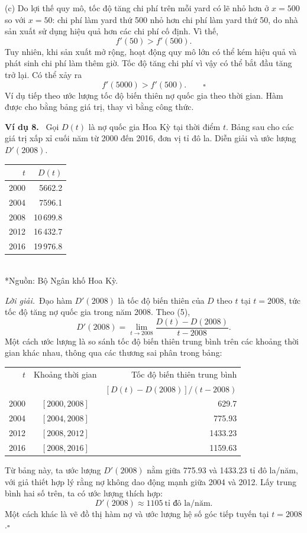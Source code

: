 \documentclass[12pt,a4paper]{article}
\newcommand{\ex}[1]{\par\medskip\noindent\textbf{Ví dụ #1.}\ }
\newcommand{\sol}{\par\nopagebreak[4]\noindent\textit{Lời giải.}\ }
\begin{document}
(c) Do lợi thế quy mô, tốc độ tăng chi phí trên mỗi yard có lẽ nhỏ hơn ở $x=500$ so với $x=50$: chi phí làm yard thứ 500 nhỏ hơn chi phí làm yard thứ 50, do nhà sản xuất sử dụng hiệu quả hơn các chi phí cố định. Vì thế,
\[f'(50)>f'(500).\]
Tuy nhiên, khi sản xuất mở rộng, hoạt động quy mô lớn có thể kém hiệu quả và phát sinh chi phí làm thêm giờ. Tốc độ tăng chi phí vì vậy có thể bắt đầu tăng trở lại. Có thể xảy ra
\[f'(5000)>f'(500).\qquad\square\]
Ví dụ tiếp theo ước lượng tốc độ biến thiên nợ quốc gia theo thời gian. Hàm được cho bằng bảng giá trị, thay vì bằng công thức.
\ex{8} Gọi $D(t)$ là nợ quốc gia Hoa Kỳ tại thời điểm $t$. Bảng sau cho các giá trị xấp xỉ cuối năm từ 2000 đến 2016, đơn vị tỉ đô la. Diễn giải và ước lượng $D'(2008)$.
\begin{center}\begin{tabular}{rr}\toprule$t$&$D(t)$\\\midrule
2000&5662.2\\2004&7596.1\\2008&10\,699.8\\2012&16\,432.7\\2016&19\,976.8\\\bottomrule
\end{tabular}\\*{\small Nguồn: Bộ Ngân khố Hoa Kỳ.}\end{center}
\sol Đạo hàm $D'(2008)$ là tốc độ biến thiên của $D$ theo $t$ tại $t=2008$, tức tốc độ tăng nợ quốc gia trong năm 2008. Theo (5),
\[D'(2008)=\lim_{t\to2008}\frac{D(t)-D(2008)}{t-2008}.\]
Một cách ước lượng là so sánh tốc độ biến thiên trung bình trên các khoảng thời gian khác nhau, thông qua các thương sai phân trong bảng:
\begin{center}\begin{tabular}{rcr}\toprule
$t$&Khoảng thời gian&Tốc độ biến thiên trung bình\\
&&$[D(t)-D(2008)]/(t-2008)$\\\midrule
2000&$[2000,2008]$&629.7\\
2004&$[2004,2008]$&775.93\\
2012&$[2008,2012]$&1433.23\\
2016&$[2008,2016]$&1159.63\\\bottomrule
\end{tabular}\end{center}
Từ bảng này, ta ước lượng $D'(2008)$ nằm giữa 775.93 và 1433.23 tỉ đô la/năm, với giả thiết hợp lý rằng nợ không dao động mạnh giữa 2004 và 2012. Lấy trung bình hai số trên, ta có ước lượng thích hợp:
\[D'(2008)\approx1105\ \text{tỉ đô la/năm}.\]
Một cách khác là vẽ đồ thị hàm nợ và ước lượng hệ số góc tiếp tuyến tại $t=2008$.\hfill$\square$
\end{document}
